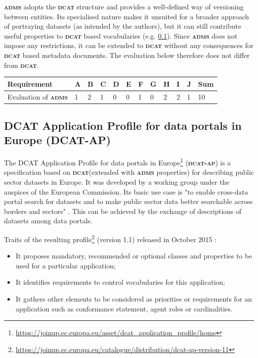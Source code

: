\documentclass[a4paper,english,twoside,BCOR1.5cm,headsepline,DIV12,appendixprefix,final,12pt]{scrbook}
\newcommand{\dcat}{{\scshape\bfseries dcat}\xspace}
\newcommand{\dcatap}{{\scshape\bfseries dcat-ap}\xspace}
\newcommand{\adms}{{\scshape\bfseries adms}\xspace}
\newcommand\footnoteurl[1]{\footnote{\scriptsize\url{#1}}}
\begin{document}
\adms adopts the \dcat structure and provides a well-defined way of versioning between entities. Its specialised nature makes it unsuited for a broader approach of portraying datasets (as intended by the authors), but it can still contribute useful properties to \dcat based vocabularies (e.g. \cref{sec:dcatap}). Since \adms does not impose any restrictions, it can be extended to \dcat without any consequences for \dcat based metadata documents. The evaluation below therefore does not differ from \dcat.

\begin{table}[!htbp]
    \centering
    \begin{tabular}{|l|l|l|l|l|l|l|l|l|l|l|l|}
        \hline
        Requirement & A & B & C & D & E & F & G & H & I & J & Sum \\
        \hline
        Evaluation of \adms & 1 & 2 & 1 & 0 & 0 & 1 & 0 & 2 & 2 & 1 & 10 \\
        \hline
    \end{tabular}
    \label{tab:evaladms}
\end{table}

\subsection{DCAT Application Profile for data portals in Europe (DCAT-AP)}
\label{sec:dcatap}

The DCAT Application Profile for data portals in Europe\footnoteurl{https://joinup.ec.europa.eu/asset/dcat_application_profile/home} (\dcatap) is a specification based on \dcat (extended with \adms properties) for describing public sector datasets in Europe. It was developed by a working group under the auspices of the European Commission. Its basic use case is "to enable cross-data portal search for datasets and to make public sector data better searchable across borders and sectors" \cite{dcatap11}. This can be achieved by the exchange of descriptions of datasets among data portals.

Traits of the resulting profile\footnoteurl{https://joinup.ec.europa.eu/catalogue/distribution/dcat-ap-version-11} (version 1.1) released in October 2015 \cite{dekkersDcatApW3C2016}:

\begin{itemize}
\item It proposes mandatory, recommended or optional classes and properties to be used for a particular
application;
\item It identifies requirements to control vocabularies for this application;
\item It gathers other elements to be considered as priorities or requirements for an application such as
conformance statement, agent roles or cardinalities.
\end{itemize}
\end{document}

